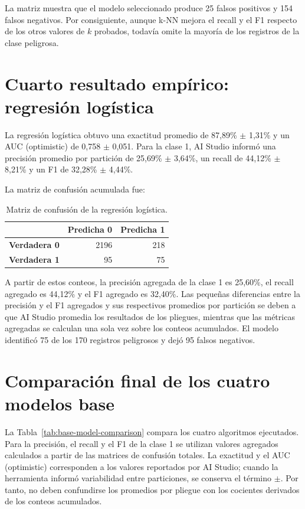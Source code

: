 \documentclass[12pt,a4paper]{article}
\begin{document}
La matriz muestra que el modelo seleccionado produce 25 falsos positivos y 154 falsos negativos. Por consiguiente, aunque k-NN mejora el recall y el F1 respecto de los otros valores de $k$ probados, todavía omite la mayoría de los registros de la clase peligrosa.

\section{Cuarto resultado empírico: regresión logística}
La regresión logística obtuvo una exactitud promedio de 87,89\% $\pm$ 1,31\% y un AUC (optimistic) de 0,758 $\pm$ 0,051. Para la clase 1, AI Studio informó una precisión promedio por partición de 25,69\% $\pm$ 3,64\%, un recall de 44,12\% $\pm$ 8,21\% y un F1 de 32,28\% $\pm$ 4,44\%.

La matriz de confusión acumulada fue:
\begin{table}[H]
\centering
\caption{Matriz de confusión de la regresión logística.}
\label{tab:logistic-matrix}
\begin{tabular}{lrr}
\toprule
 & \textbf{Predicha 0} & \textbf{Predicha 1} \\
\midrule
\textbf{Verdadera 0} & 2196 & 218 \\
\textbf{Verdadera 1} & 95 & 75 \\
\bottomrule
\end{tabular}
\end{table}

A partir de estos conteos, la precisión agregada de la clase 1 es 25,60\%, el recall agregado es 44,12\% y el F1 agregado es 32,40\%. Las pequeñas diferencias entre la precisión y el F1 agregados y sus respectivos promedios por partición se deben a que AI Studio promedia los resultados de los pliegues, mientras que las métricas agregadas se calculan una sola vez sobre los conteos acumulados. El modelo identificó 75 de los 170 registros peligrosos y dejó 95 falsos negativos.

\section{Comparación final de los cuatro modelos base}
La Tabla~\ref{tab:base-model-comparison} compara los cuatro algoritmos ejecutados. Para la precisión, el recall y el F1 de la clase 1 se utilizan valores agregados calculados a partir de las matrices de confusión totales. La exactitud y el AUC (optimistic) corresponden a los valores reportados por AI Studio; cuando la herramienta informó variabilidad entre particiones, se conserva el término $\pm$. Por tanto, no deben confundirse los promedios por pliegue con los cocientes derivados de los conteos acumulados.
\end{document}
